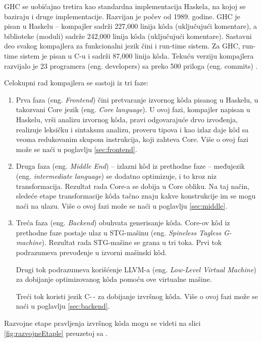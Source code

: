 GHC se uobičajno tretira kao standardna implementacija Haskela, na kojoj se baziraju i druge implementacije. Razvijan je počev od 1989. godine. GHC je pisan u Haskelu – kompajler sadrži 227,000 linija k\^{o}da (uključujući komentare), a biblioteke (moduli) sadrže 242,000 linija k\^{o}da (uključujući komentare).
Sastavni deo svakog kompajlera za funkcionalni jezik čini i run-time sistem. Za GHC, run-time sistem je pisan u C-u i sadrži 87,000 linija k\^{o}da. Tekuću verziju kompajlera razvijalo je 23 programera (eng. developers) sa preko 500 priloga (eng. commits) \cite{StanfordGHC}.  


Celokupni rad kompajlera se sastoji iz tri faze:
\begin{enumerate}
	\item Prva faza (eng. \emph{Frontend}) čini pretvaranje izvornog k\^{o}da pisanog u Haskelu, u takozvani Core jezik (eng. \emph {Core language}). U ovoj fazi, kompajler napisan u Haskelu, vrši analizu izvornog k\^{o}da, pravi odgovarajuće drvo izvođenja, realizuje leksičku i sintaksnu analizu, proveru tipova i kao izlaz daje k\^{o}d sa veoma redukovanim skupom instrukcija, koji zahteva Core. Više o ovoj fazi može se naći u poglavlju \ref{sec:frontend}.
	\item Druga faza (eng. \emph {Middle End}) – izlazni k\^{o}d iz prethodne faze – međujezik (eng. \emph {intermediate language}) se dodatno optimizuje, i to kroz niz transformacija. Rezultat rada Core-a se dobija u Core obliku. Na taj način, sledeće etape transformacije k\^{o}da tačno znaju kakve konstrukcije im se mogu naći na ulazu.  Više o ovoj fazi može se naći u poglavlju \ref{sec:middle}.
	\item Treća faza (eng. \emph {Backend}) obuhvata generisanje k\^{o}da. Core-ov k\^{o}d iz prethodne faze postaje ulaz u STG-mašinu (eng. \emph {Spineless Tagless G-machine}). Rezultat rada STG-mašine se grana u tri toka. Prvi tok podrazumeva prevođenje u izvorni mašinski k\^{o}d. 
	
	Drugi tok podrazumeva korišćenje LLVM-a (eng. \emph{Low-Level Virtual Machine}) za dobijanje optimizovanog k\^{o}da pomoću ove virtualne mašine.
	
	Treći tok koristi jezik C-\,- za dobijanje izvršnog k\^{o}da. Više o ovoj fazi može se naći u poglavlju \ref{sec:backend}.
\end{enumerate}

Razvojne etape pravljenja izvršnog k\^{o}da mogu se videti na slici \ref{fig:razvojneEtaple} preuzetoj sa \cite{StanfordGHC}.

